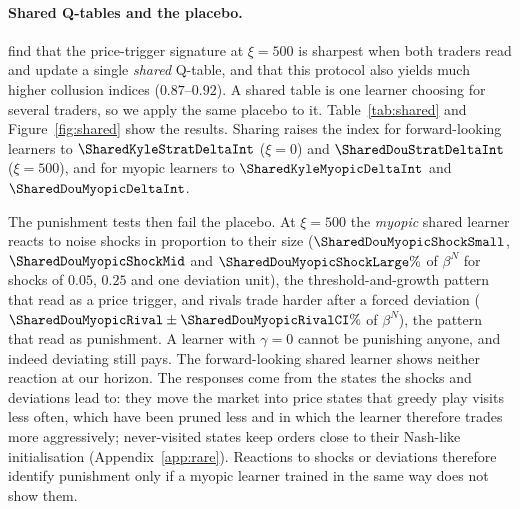 \paragraph{Shared Q-tables and the placebo.} \citet{esquinas2026} find that the
price-trigger signature at $\xi=500$ is sharpest when both traders read and
update a single \emph{shared} Q-table, and that this protocol also yields
much higher collusion indices ($0.87$--$0.92$). A shared table is one learner
choosing for several traders, so we apply the same placebo to it.
Table~\ref{tab:shared} and Figure~\ref{fig:shared} show the results. Sharing
raises the index for forward-looking learners to $\SharedKyleStratDeltaInt$
($\xi=0$) and $\SharedDouStratDeltaInt$ ($\xi=500$), and for myopic learners to
$\SharedKyleMyopicDeltaInt$ and $\SharedDouMyopicDeltaInt$.

The punishment tests then fail the placebo. At $\xi=500$ the \emph{myopic}
shared learner reacts to noise shocks in proportion to their size
($\SharedDouMyopicShockSmall$, $\SharedDouMyopicShockMid$ and
$\SharedDouMyopicShockLarge\%$ of $\beta^N$ for shocks of $0.05$, $0.25$ and one
deviation unit), the threshold-and-growth pattern that \citet{dou2025} read as
a price trigger, and rivals trade harder after a forced deviation
($\SharedDouMyopicRival\pm\SharedDouMyopicRivalCI\%$ of $\beta^N$), the pattern
that \citet{calvano2020} read as punishment. A learner with $\gamma=0$ cannot
be punishing anyone, and indeed deviating still pays. The forward-looking
shared learner shows neither reaction at our horizon. The responses come from
the states the shocks and deviations lead to: they move the market into price
states that greedy play visits less often, which have been pruned less and in
which the learner therefore trades more aggressively; never-visited states keep
orders close to their Nash-like initialisation (Appendix~\ref{app:rare}).
Reactions to shocks or deviations therefore identify punishment only if a
myopic learner trained in the same way does not show them.

